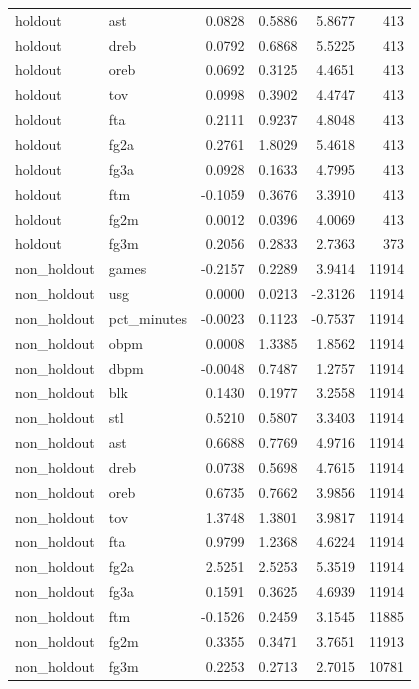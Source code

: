 \begin{table}
\begin{tabular}{llrrrr}
holdout & ast & 0.0828 & 0.5886 & 5.8677 & 413 \\
holdout & dreb & 0.0792 & 0.6868 & 5.5225 & 413 \\
holdout & oreb & 0.0692 & 0.3125 & 4.4651 & 413 \\
holdout & tov & 0.0998 & 0.3902 & 4.4747 & 413 \\
holdout & fta & 0.2111 & 0.9237 & 4.8048 & 413 \\
holdout & fg2a & 0.2761 & 1.8029 & 5.4618 & 413 \\
holdout & fg3a & 0.0928 & 0.1633 & 4.7995 & 413 \\
holdout & ftm & -0.1059 & 0.3676 & 3.3910 & 413 \\
holdout & fg2m & 0.0012 & 0.0396 & 4.0069 & 413 \\
holdout & fg3m & 0.2056 & 0.2833 & 2.7363 & 373 \\
non\_holdout & games & -0.2157 & 0.2289 & 3.9414 & 11914 \\
non\_holdout & usg & 0.0000 & 0.0213 & -2.3126 & 11914 \\
non\_holdout & pct\_minutes & -0.0023 & 0.1123 & -0.7537 & 11914 \\
non\_holdout & obpm & 0.0008 & 1.3385 & 1.8562 & 11914 \\
non\_holdout & dbpm & -0.0048 & 0.7487 & 1.2757 & 11914 \\
non\_holdout & blk & 0.1430 & 0.1977 & 3.2558 & 11914 \\
non\_holdout & stl & 0.5210 & 0.5807 & 3.3403 & 11914 \\
non\_holdout & ast & 0.6688 & 0.7769 & 4.9716 & 11914 \\
non\_holdout & dreb & 0.0738 & 0.5698 & 4.7615 & 11914 \\
non\_holdout & oreb & 0.6735 & 0.7662 & 3.9856 & 11914 \\
non\_holdout & tov & 1.3748 & 1.3801 & 3.9817 & 11914 \\
non\_holdout & fta & 0.9799 & 1.2368 & 4.6224 & 11914 \\
non\_holdout & fg2a & 2.5251 & 2.5253 & 5.3519 & 11914 \\
non\_holdout & fg3a & 0.1591 & 0.3625 & 4.6939 & 11914 \\
non\_holdout & ftm & -0.1526 & 0.2459 & 3.1545 & 11885 \\
non\_holdout & fg2m & 0.3355 & 0.3471 & 3.7651 & 11913 \\
non\_holdout & fg3m & 0.2253 & 0.2713 & 2.7015 & 10781 \\
\bottomrule
\end{tabular}
\end{table}
